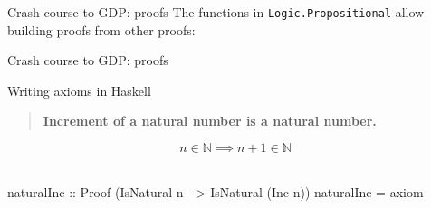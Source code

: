 \documentclass[
  9pt,
  ignorenonframetext,
]{beamer}
\newenvironment{Shaded}{}{}
\newcommand{\CommentTok}[1]{\textcolor[rgb]{0.38,0.63,0.69}{\textit{#1}}}
\newcommand{\DataTypeTok}[1]{\textcolor[rgb]{0.56,0.13,0.00}{#1}}
\newcommand{\KeywordTok}[1]{\textcolor[rgb]{0.00,0.44,0.13}{\textbf{#1}}}
\newcommand{\NormalTok}[1]{#1}
\newcommand{\OperatorTok}[1]{\textcolor[rgb]{0.40,0.40,0.40}{#1}}
\newcommand{\OtherTok}[1]{\textcolor[rgb]{0.00,0.44,0.13}{#1}}
\begin{document}
\begin{frame}[fragile]{Crash course to GDP: proofs}
\protect\hypertarget{crash-course-to-gdp-proofs-4}{}
The functions in \texttt{Logic.Propositional} allow building proofs from
other proofs:

\begin{Shaded}
\end{Shaded}




\end{frame}

\begin{frame}[fragile]{Crash course to GDP: proofs}
\protect\hypertarget{crash-course-to-gdp-proofs-5}{}
\begin{block}{Writing axioms in Haskell}
\protect\hypertarget{writing-axioms-in-haskell}{}
\hfill\break

\begin{quote}
\textbf{Increment of a natural number is a natural number.}
\end{quote}

\[ n \in \mathbb{N} \implies n + 1 \in \mathbb{N} \]\\

\begin{Shaded}
\begin{Highlighting}[]
\NormalTok{naturalInc }
\OtherTok{  ::} \DataTypeTok{Proof}\NormalTok{ (}\DataTypeTok{IsNatural}\NormalTok{ n }\OperatorTok{{-}{-}\textgreater{}} \DataTypeTok{IsNatural}\NormalTok{ (}\DataTypeTok{Inc}\NormalTok{ n))}
\NormalTok{naturalInc }\OtherTok{=}\NormalTok{ axiom}
\end{Highlighting}
\end{Shaded}
\end{block}


\end{frame}
\end{document}
